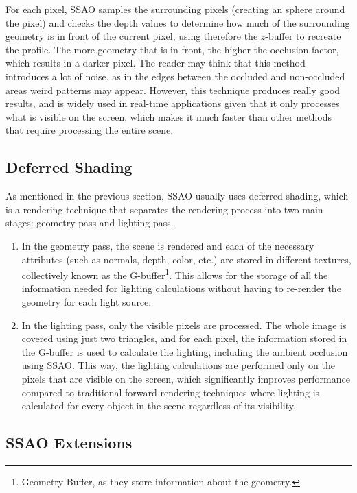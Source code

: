 For each pixel, SSAO samples the surrounding pixels (creating an sphere around the pixel) and checks the depth values to determine how much of the surrounding geometry is in front of the current pixel, using therefore the $z$-buffer to recreate the profile. The more geometry that is in front, the higher the occlusion factor, which results in a darker pixel. The reader may think that this method introduces a lot of noise, as in the edges between the occluded and non-occluded areas weird patterns may appear. However, this technique produces really good results, and is widely used in real-time applications given that it only processes what is visible on the screen, which makes it much faster than other methods that require processing the entire scene.

\subsection{Deferred Shading}\label{sec:deferred_shading}

As mentioned in the previous section, SSAO usually uses deferred shading, which is a rendering technique that separates the rendering process into two main stages: geometry pass and lighting pass.
\begin{enumerate}
    \item In the geometry pass, the scene is rendered and each of the necessary attributes (such as normals, depth, color, etc.) are stored in different textures, collectively known as the G-buffer\footnote{Geometry Buffer, as they store information about the geometry.}. This allows for the storage of all the information needed for lighting calculations without having to re-render the geometry for each light source.
    \item In the lighting pass, only the visible pixels are processed. The whole image is covered using just two triangles, and for each pixel, the information stored in the G-buffer is used to calculate the lighting, including the ambient occlusion using SSAO. This way, the lighting calculations are performed only on the pixels that are visible on the screen, which significantly improves performance compared to traditional forward rendering techniques where lighting is calculated for every object in the scene regardless of its visibility.
\end{enumerate}

\subsection{SSAO Extensions}

